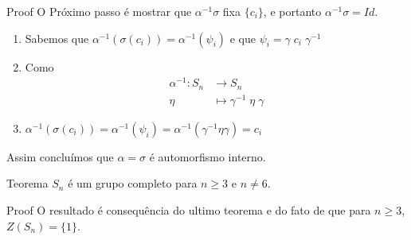 \begin{frame}{}
\begin{block}{Proof}
    O Próximo passo é mostrar que $\alpha^{-1}\sigma$ fixa $\{c_i\}$, e portanto $\alpha^{-1}\sigma = Id$. 
    \begin{enumerate}
        \item Sabemos que $\alpha^{-1}(\sigma(c_i))=\alpha^{-1}(\psi_i)$ e que $\psi_i = \gamma \; c_i \;\gamma^{-1}$
        \item Como 
\[
\begin{aligned}
\alpha^{-1} : S_n &\longrightarrow S_n\\
\eta &\longmapsto \gamma^{-1} \; \eta \; \gamma
\end{aligned}
\]
\item $\alpha^{-1}(\sigma(c_i))= \alpha^{-1}(\psi_i)=\alpha^{-1}( \gamma^{-1}  \eta  \gamma) = c_i$

    \end{enumerate}
 
    
    Assim concluímos que $\alpha = \sigma$ é automorfismo interno. 
\end{block}
    
\end{frame}
\begin{frame}{}
\begin{block}{Teorema}
$S_n$ é um grupo completo para $n \geq 3 $ e $n \neq 6$.   
\end{block}

\begin{block}{Proof}
    O resultado é consequência do ultimo teorema e do fato de que para $n \geq 3$, $Z(S_n) = \{1\}$.
\end{block}
    
\end{frame}